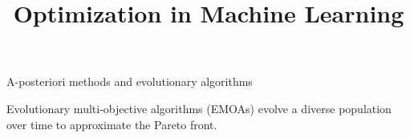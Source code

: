\documentclass[11pt,compress,t,notes=noshow,xcolor=table]{beamer}
\title{Optimization in Machine Learning}
\begin{document}

\begin{vbframe}{A-posteriori methods and evolutionary algorithms}

Evolutionary multi-objective algorithms (EMOAs) evolve a diverse population over time to approximate the Pareto front.

\vspace{-0.6cm}


\end{vbframe}
\end{document}
